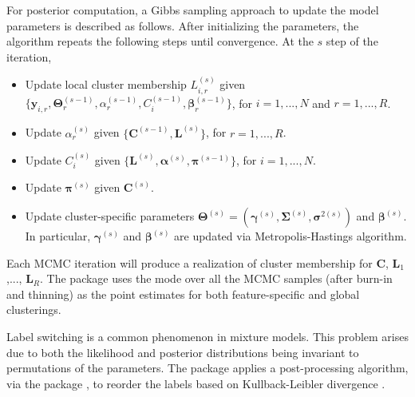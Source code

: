 For posterior computation, a Gibbs sampling approach to update the model parameters is described as follows.  After initializing the parameters, the algorithm repeats the following steps until convergence.  At the $s$ step of the iteration, 
 \begin{itemize}
	\item Update local cluster membership $ L_{i,r}^{(s)}$ given $\{\boldsymbol{y}_{i,r}, \boldsymbol{\Theta}_r^{(s-1)}, \alpha_r^{(s-1)}, C_i^{(s-1)}, \boldsymbol{\beta}_r^{(s-1)} \}$, for $i=1,...,N$ and  $r=1,...,R$.
	\item Update $\alpha_r^{(s)}$ given $\{ \boldsymbol{C}^{(s-1)}, \boldsymbol{L}^{(s)} \}$, for $r=1,...,R$.
	\item Update $ C_i^{(s)}$ given $\{ \boldsymbol{L}^{(s)},  \boldsymbol{\alpha}^{(s)}, \boldsymbol{\pi}^{(s-1)}\}$, for $i=1,...,N$.
	\item Update $\boldsymbol{\pi}^{(s)}$ given $ \boldsymbol{C}^{(s)}$.
	\item Update cluster-specific parameters $\boldsymbol{\Theta}^{(s)} = (\boldsymbol{\gamma}^{(s)},\boldsymbol{\Sigma}^{(s)}, \boldsymbol{\sigma}^{2(s)})$ and  $\boldsymbol{\beta}^{(s)}$. In particular, $\boldsymbol{\gamma}^{(s)}$ and $\boldsymbol{\beta}^{(s)}$ are updated via Metropolis-Hastings algorithm.
\end{itemize}
Each MCMC iteration will produce a realization of cluster membership for $\boldsymbol{C}$, $\boldsymbol{L}_1$,..., $\boldsymbol{L}_R$. The package uses the mode over all the MCMC samples (after burn-in and thinning) as the point estimates for both feature-specific and global clusterings. 

Label switching is a common phenomenon in mixture models. This problem arises due to both the likelihood and posterior distributions being invariant to permutations of the parameters. The  package applies a post-processing algorithm, via the  package \citep{Papastamoulis2016}, to reorder the labels based on Kullback-Leibler divergence \citep{Stephens2000}.

